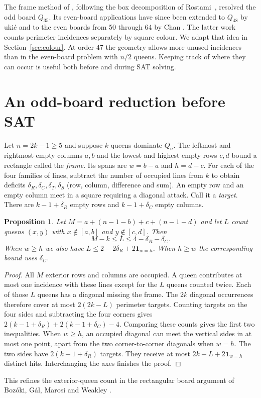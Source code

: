\documentclass[11pt]{article}
\newtheorem{proposition}[theorem]{Proposition}
\newcommand{\ind}[1]{\mathbf{1}_{#1}}
\begin{document}
The frame method of \cite{Davies}, following the box decomposition of
Rostami~\cite{HC}, resolved the odd board $Q_{35}$. Its even-board applications
have since been extended to $Q_{48}$ by \DJ uki\'c \cite{Djukic} and to the
even boards from 50 through 64 by Chan \cite{Chan}. The latter work counts
perimeter incidences separately by square colour. We adapt that idea in
Section~\ref{sec:colour}. At order 47 the geometry allows more unused
incidences than in the even-board problem with $n/2$ queens. Keeping track
of where they can occur is useful both before and during SAT solving.

\section{An odd-board reduction before SAT}
Let $n=2k-1\ge5$ and suppose $k$ queens dominate $Q_n$. The leftmost and
rightmost empty columns $a,b$ and the lowest and highest empty rows $c,d$
bound a rectangle called the \emph{frame}. Its spans are $w=b-a$ and
$h=d-c$. For each of the four families of lines, subtract the number of
occupied lines from $k$ to obtain deficits $\delta_R,\delta_C,\delta_T,
\delta_S$ (row, column, difference and sum). An empty row and an empty
column meet in a square requiring a diagonal attack. Call it a
\emph{target}. There are $k-1+\delta_R$ empty rows and $k-1+\delta_C$
empty columns.

\begin{proposition}\label{prop:margin}
Let $M=a+(n-1-b)+c+(n-1-d)$ and let $L$ count queens $(x,y)$
with $x\notin[a,b]$ and $y\notin[c,d]$. Then
\[
 M-k\le L\le4-\delta_R-\delta_C.
\]
When $w\ge h$ we also have $L\le2-2\delta_R+2\ind{w=h}$.
When $h\ge w$ the corresponding bound uses $\delta_C$.
\end{proposition}
\begin{proof}
All $M$ exterior rows and columns are occupied. A queen contributes at
most one incidence with these lines except for the $L$ queens counted
twice. Each of those $L$ queens has a diagonal missing the frame. The
$2k$ diagonal occurrences therefore cover at most $2(2k-L)$ perimeter
targets. Counting targets on the four sides and subtracting the four
corners gives $2(k-1+\delta_R)+2(k-1+\delta_C)-4$. Comparing these counts
gives the first two inequalities. When $w\ge h$, an occupied diagonal
can meet the vertical sides in at most one point, apart from the two
corner-to-corner diagonals when $w=h$. The two sides have
$2(k-1+\delta_R)$ targets. They receive at most $2k-L+2\ind{w=h}$
distinct hits. Interchanging the axes finishes the proof.
\end{proof}
This refines the exterior-queen count in the rectangular board argument
of Boz\'oki, G\'al, Marosi and Weakley \cite{BGMW}.
\end{document}
